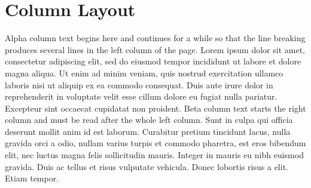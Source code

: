 \documentclass[10pt,twocolumn]{article}
\begin{document}
\section*{Column Layout}
Alpha column text begins here and continues for a while so that the line
breaking produces several lines in the left column of the page. Lorem ipsum
dolor sit amet, consectetur adipiscing elit, sed do eiusmod tempor incididunt
ut labore et dolore magna aliqua. Ut enim ad minim veniam, quis nostrud
exercitation ullamco laboris nisi ut aliquip ex ea commodo consequat. Duis
aute irure dolor in reprehenderit in voluptate velit esse cillum dolore eu
fugiat nulla pariatur. Excepteur sint occaecat cupidatat non proident.
\newpage
Beta column text starts the right column and must be read after the whole
left column. Sunt in culpa qui officia deserunt mollit anim id est laborum.
Curabitur pretium tincidunt lacus, nulla gravida orci a odio, nullam varius
turpis et commodo pharetra, est eros bibendum elit, nec luctus magna felis
sollicitudin mauris. Integer in mauris eu nibh euismod gravida. Duis ac tellus
et risus vulputate vehicula. Donec lobortis risus a elit. Etiam tempor.
\end{document}
